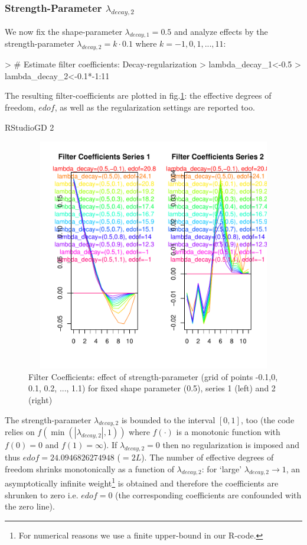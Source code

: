\documentclass[a4paper]{book}
\begin{document}
\subsubsection{Strength-Parameter $\lambda_{decay,2}$}


We now fix the shape-parameter $\lambda_{decay,1}=0.5$ and analyze effects by the strength-parameter $\lambda_{decay,2}=k\cdot 0.1$ where $k=-1,0,1,...,11$:
\begin{Schunk}
\begin{Sinput}
> # Estimate filter coefficients: Decay-regularization
> lambda_decay_1<-0.5
> lambda_decay_2<-0.1*-1:11
\end{Sinput}
\end{Schunk}
The resulting filter-coefficients  are plotted in fig.\ref{z_mdfa_ms_reg_decay_screen_decay_2}: the effective degrees of freedom, $edof$, as well as the regularization settings are reported too.
\begin{Schunk}
\begin{Soutput}
RStudioGD 
        2 
\end{Soutput}
\end{Schunk}
\begin{figure}[H]\begin{center}\includegraphics[height=4in, width=6in]{z_mdfa_ms_reg_decay_screen_decay_2}\caption{Filter Coefficients: effect of strength-parameter (grid of points -0.1,0, 0.1, 0.2, ..., 1.1) for fixed shape parameter (0.5), series 1 (left) and 2 (right)\label{z_mdfa_ms_reg_decay_screen_decay_2}}\end{center}\end{figure}The strength-parameter $\lambda_{decay,2}$ is bounded to the interval $[0,1]$, too (the code relies on $f(\min(|\lambda_{decay,2}|,1))$ where $f(\cdot)$ is a monotonic function with $f(0)=0$ and $f(1)=\infty$). If $\lambda_{decay,2}=0$ then no regularization is imposed and thus $edof=24.0946826274948$ ($=2L$). The number of effective degrees of freedom shrinks monotonically as a function of $\lambda_{decay,2}$: for `large' $\lambda_{decay,2}\to 1$, an asymptotically infinite weight\footnote{For numerical reasons we use a finite upper-bound in our R-code.} is obtained and therefore the coefficients are shrunken to zero i.e. $edof=0$ (the corresponding coefficients are confounded with the zero line).
\end{document}
